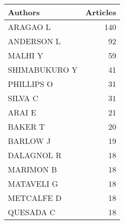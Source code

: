 
\begin{tabular}{lr}
\toprule
Authors & Articles\\
\midrule
ARAGAO L & 140\\
ANDERSON L & 92\\
MALHI Y & 59\\
SHIMABUKURO Y & 41\\
PHILLIPS O & 31\\
\addlinespace
SILVA C & 31\\
ARAI E & 21\\
BAKER T & 20\\
BARLOW J & 19\\
DALAGNOL R & 18\\
\addlinespace
MARIMON B & 18\\
MATAVELI G & 18\\
METCALFE D & 18\\
QUESADA C & 18\\
\bottomrule
\end{tabular}